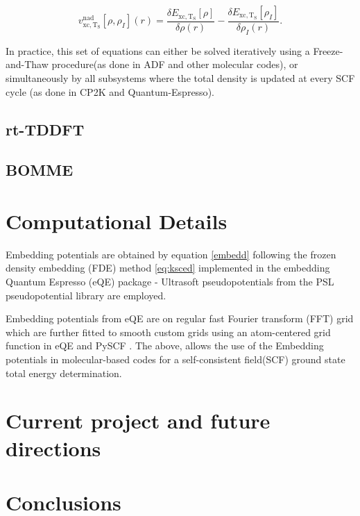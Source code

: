 \documentclass[notitlepage,12pt]{report}
\begin{document}
	\begin{equation}
		\label{emb_xct}
		v_{\mathrm{xc, T_{S}}}^{\mathrm{nad}}[\rho,\rho_{I}](r) = \frac{\delta E_{\mathrm{xc, T_{S}}}[\rho]}{\delta \rho(r)} - \frac{\delta E_{\mathrm{xc, T_{S}}}[\rho_I]}{\delta \rho_I(r)}.
	\end{equation}

	In practice, this set of equations can either be solved iteratively using  a Freeze-and-Thaw\supercite{FaT} procedure(as done in ADF\supercite{te2001chemistry} and other molecular codes), or simultaneously by all subsystems where the total density is updated at every SCF cycle (as done in CP2K \supercite{hutter2014cp2k} and Quantum-Espresso\supercite{RN48,mi2021eqe}).

\subsection{rt-TDDFT}


\subsection{BOMME}

\section{Computational Details}

	Embedding potentials are obtained by equation \ref{embedd} following the frozen density embedding (FDE) method \ref{eq:ksced} implemented in the embedding Quantum Espresso (eQE) package \supercite{genova2017eqe}- Ultrasoft pseudopotentials from the PSL pseudopotential library \supercite{corso2014comput} are employed. 
	
	Embedding potentials from eQE are on regular fast Fourier transform (FFT) grid which are further fitted to smooth custom grids using an atom-centered grid function in eQE \supercite{genova2017eqe} and PySCF \supercite{PYSCF}. The above, allows the use of the Embedding potentials in molecular-based codes for a self-consistent field(SCF)\supercite{purvis1976transition} ground state total energy determination. 

\section{Current project and future directions}


\section{Conclusions}

\printbibliography
\end{document}
